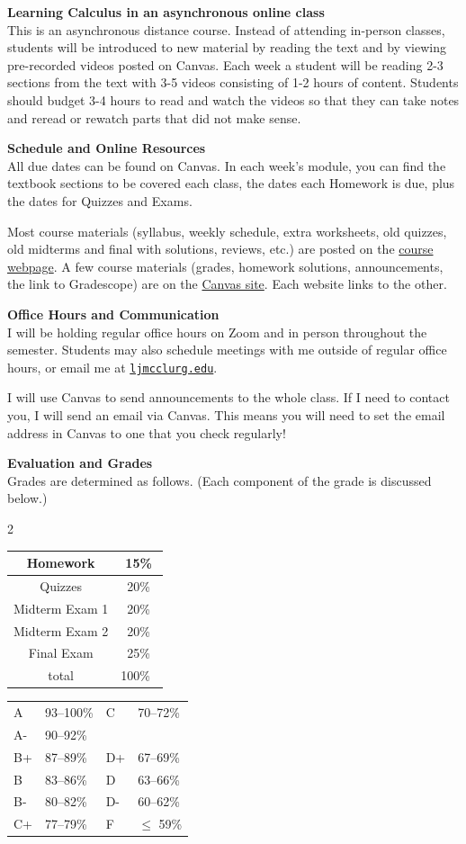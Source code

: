 \documentclass[12pt]{article}
\renewcommand{\emph}[1]{\textsf{\textbf{#1}}}
\newcommand{\localhead}[1]{\par\smallskip\textbf{#1} \smallskip\nobreak\\}%
\def\heading#1{\localhead{\large\emph{#1}}}
\begin{document}
\heading{Learning Calculus in an asynchronous online class}
This is an asynchronous distance course. Instead of attending in-person classes, students will be introduced to new material by reading the text and by viewing pre-recorded videos posted on Canvas. Each week a student  will be reading 2-3 sections from the text with 3-5 videos consisting of 1-2 hours of content. Students should budget 3-4 hours to read and watch the
videos so that they can take notes and reread or rewatch parts that did not make sense.

\pagebreak

\heading{Schedule and Online Resources}
All due dates can be found on Canvas. In each week's module, you can find the textbook sections to be covered each class, the dates each Homework is due, plus the dates for Quizzes and Exams.

Most course materials (syllabus, weekly schedule, extra worksheets, old quizzes, old midterms and final with solutions, reviews, etc.) are posted on the \href{https://uaf-math251.github.io/calc2/}{course webpage}.  A few course materials (grades, homework solutions, announcements, the link to Gradescope) are on the \href{https://canvas.alaska.edu/courses/21589}{Canvas site}.  Each website links to the other.


\heading{Office Hours and Communication}
I will be holding regular office hours on Zoom and in person throughout the semester. Students may also schedule meetings with me outside of regular office hours, or email me at \href{mailto:ljmcclurg@alaska.edu}{\texttt{ljmcclurg\@@alaska.edu}}.

I will use Canvas to send announcements to the whole class. If I need to contact you, I will send an email via Canvas.  This means you will need to set the email address in Canvas to one that you check regularly!


\heading{Evaluation and Grades}
Grades are determined as follows.  (Each component of the grade is discussed below.)
 
\begin{multicols}{2}
\begin{tabular}{|c|c|}
\hline
Homework & 15\% \\
\hline
Quizzes & 20\% \\
\hline
Midterm Exam 1 & 20\% \\
\hline
Midterm Exam 2 & 20\%  \\
\hline
Final Exam & 25\% \\
\hline
total & 100\% \, \\
\hline
\end{tabular}


\begin{tabular}{llll}
A  & 93--100\%& C  & 70--72\%  \\
A- & 90--92\% & &  \\
B+ & 87--89\% & D+ & 67--69\%  \\
B  & 83--86\% & D  & 63--66\%  \\
B- & 80--82\% & D- & 60--62\%  \\
C+ & 77--79\% & F  & $\le$ 59\%
\end{tabular}
\end{multicols}
\end{document}
